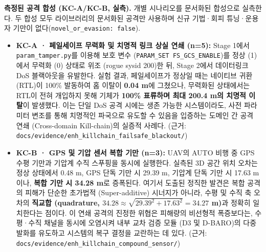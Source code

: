 \textbf{측정된 공격 합성 (KC-A/KC-B, 실측).} 개별 시나리오를 문서화된 합성으로 실측한다. 두 합성 모두 라이브러리의 문서화된 공격만 사용하며 신규 기법·회피 튜닝·운용자 기만이 없다(\texttt{novel\_or\_evasion: false}).

\begin{itemize}[leftmargin=*]
    \item \textbf{KC-A · 페일세이프 무력화 및 치명적 링크 상실 연쇄 (n=5):}
    Stage 1에서 \texttt{param\_tamper.py}를 이용해 보호 변수 (\texttt{PARAM\_SET FS\_GCS\_ENABLE})를 정상 (1)에서 무력화 (0) 상태로 위조 (rogue sysid 200)한 뒤, Stage 2에서 데이터링크 DoS 블랙아웃을 유발한다. 
    실험 결과, 페일세이프가 정상일 때는 네이티브 귀환 (RTL)이 100\% 발동하여 홈 이탈이 \textbf{0.04 m}에 그쳤으나, 무력화된 상태에서는 RTL이 전혀 개입하지 못해 기체가 \textbf{100\% 표류하며 최대 200.4 m의 치명적 이탈}이 발생했다. 이는 단일 DoS 공격 시에는 생존 가능한 시스템이라도, 사전 파라미터 변조를 통해 치명적인 파국으로 유도할 수 있음을 입증하는 도메인 간 공격 연쇄 (Cross-domain Kill-chain)의 실증적 사례다. (근거: \texttt{docs/evidence/enh\_killchain\_failsafe\_blackout/})

    \item \textbf{KC-B · GPS 및 기압 센서 복합 기만 (n=3):}
    UAV의 AUTO 비행 중 GPS 수평 기만과 기압계 수직 스푸핑을 동시에 실행한다. 
    실측된 3D 공간 위치 오차는 정상 상태에서 0.48 m, GPS 단독 기만 시 29.39 m, 기압계 단독 기만 시 17.63 m이나, \textbf{복합 기만 시 34.28 m}로 증폭된다. 
    여기서 도출된 정직한 발견은 복합 공격의 피해가 단순한 초가법적 (Super-additive) 시너지가 아니라, 수평 및 수직 축 오차의 \textbf{직교합 (quadrature, $34.28 \approx \sqrt{29.39^2+17.63^2} = 34.27$ m)}과 정확히 일치한다는 점이다. 이 연쇄 공격의 진정한 위협은 피해량의 비선형적 폭증보다는, 수평·수직 채널을 동시에 오염시켜 내부 교차 검증 모듈 (D3 및 D-BARO)의 다중 발화를 유도하고 시스템의 복구 결정을 교란하는 데 있다. (근거: \texttt{docs/evidence/enh\_killchain\_compound\_sensor/})
\end{itemize}

